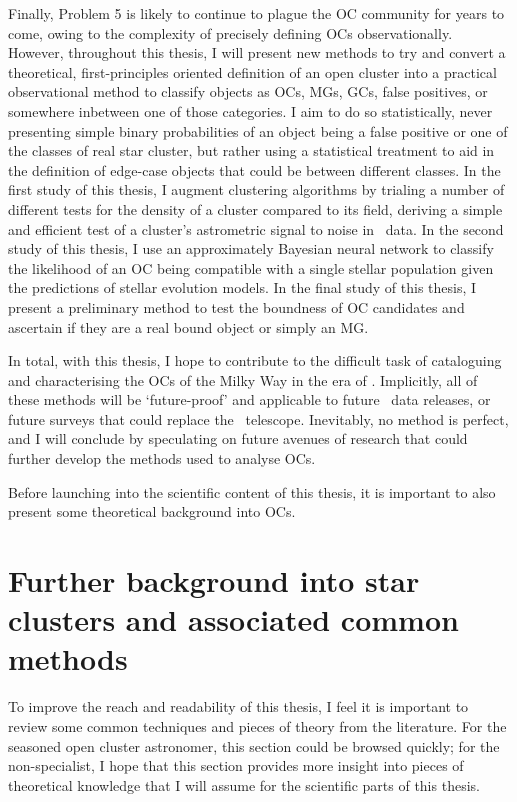 Finally, Problem 5 is likely to continue to plague the OC community for years to come, owing to the complexity of precisely defining OCs observationally. However, throughout this thesis, I will present new methods to try and convert a theoretical, first-principles oriented definition of an open cluster into a practical observational method to classify objects as OCs, MGs, GCs, false positives, or somewhere inbetween one of those categories. I aim to do so statistically, never presenting simple binary probabilities of an object being a false positive or one of the classes of real star cluster, but rather using a statistical treatment to aid in the definition of edge-case objects that could be between different classes. In the first study of this thesis, I augment clustering algorithms by trialing a number of different tests for the density of a cluster compared to its field, deriving a simple and efficient test of a cluster's astrometric signal to noise in \gaia\ data. In the second study of this thesis, I use an approximately Bayesian neural network to classify the likelihood of an OC being compatible with a single stellar population given the predictions of stellar evolution models. In the final study of this thesis, I present a preliminary method to test the boundness of OC candidates and ascertain if they are a real bound object or simply an MG.

In total, with this thesis, I hope to contribute to the difficult task of cataloguing and characterising the OCs of the Milky Way in the era of \gaia. Implicitly, all of these methods will be `future-proof' and applicable to future \gaia\ data releases, or future surveys that could replace the \gaia\ telescope. Inevitably, no method is perfect, and I will conclude by speculating on future avenues of research that could further develop the methods used to analyse OCs.


Before launching into the scientific content of this thesis, it is important to also present some theoretical background into OCs.


\section{Further background into star clusters and associated common methods}
\label{sec:intro:theory}

To improve the reach and readability of this thesis, I feel it is important to review some common techniques and pieces of theory from the literature. For the seasoned open cluster astronomer, this section could be browsed quickly; for the non-specialist, I hope that this section provides more insight into pieces of theoretical knowledge that I will assume for the scientific parts of this thesis.

